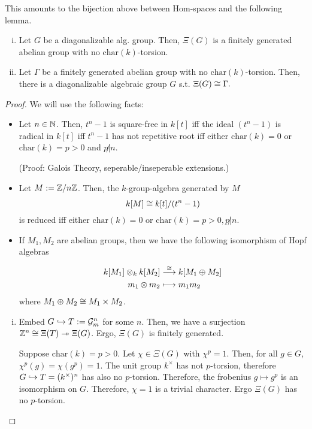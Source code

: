 This amounts to the bijection above between Hom-spaces and the following lemma.
\begin{lemma}
	\begin{enumerate}[(i)]
		\item Let $G$ be a diagonalizable alg. group. Then, $\Xi(G)$ is a finitely generated abelian group with no $\mathrm{char}(k)$-torsion.
		\item Let $\Gamma$ be a finitely generated abelian group with no $\mathrm{char}(k)$-torsion. Then, there is a diagonalizable algebraic group $G$ s.t. $\Xi(G) \overset{}{\cong} \Gamma.$
	\end{enumerate}
\end{lemma}
\newcommand{\chr}{\mathrm{char}}
\begin{proof}
We will use the following facts:
\begin{itemize}
	\item Let $n \in \mathbb{N}$. Then, 
	$t^n - 1$ is square-free in $k[t]$ iff the ideal $(t^n - 1)$ is radical in $k[t]$ iff $t^n -1$ has not repetitive root iff either $\chr(k) = 0$ or $\chr(k) = p > 0$ and $p\not | n$.
	
	(Proof: Galois Theory, seperable/inseperable extensions.)
	
	\item Let $M:= \mathbb{Z}/n\mathbb{Z}$. Then, the $k$-group-algebra generated by $M$ 
	\[k[M] \overset{}{\cong} k[t] / (t^n - 1)\]
	is reduced iff either $\chr(k) = 0$ or $\chr(k) = p > 0, p\not| n$.
	
	\item If $M_1, M_2$ are abelian groups, then we have the following isomorphism of Hopf algebras
	\begin{align*}
	k[M_1] \otimes_k k[M_2] &\overset{\overset{}{\cong}}{\longrightarrow} k[M_1 \oplus M_2]\\
	m_1 \otimes m_2 & \longmapsto m_1m_2
	\end{align*}
	where $M_1 \oplus M_2 \overset{}{\cong} M_1 \times M_2$.
\end{itemize}
\begin{enumerate}[(i)]
	\item Embed $G \overset{}{\hookrightarrow} T := \mathcal{G}^n_m$ for some $n$. Then, we have a surjection $\mathbb{Z}^n\overset{}{\cong} \Xi(T)  \overset{}{\twoheadrightarrow} \Xi(G)$. Ergo, $\Xi(G)$ is finitely generated.
	
	Suppose $\chr(k) = p > 0$. Let $\chi \in \Xi(G)$ with $\chi^p = 1$. Then, for all $g \in G$, $\chi^p(g) = \chi(g^p) = 1$. The unit group $k^\times$ has not $p$-torsion, therefore $G \overset{}{\hookrightarrow} T = (k^\times)^n$ has also no $p$-torsion. Therefore, the frobenius $g \mapsto g^p$ is an isomorphism on $G$. Therefore, $\chi = 1$ is a trivial character. Ergo $\Xi(G)$ has no $p$-torsion.
	

\end{enumerate}
\end{proof}
